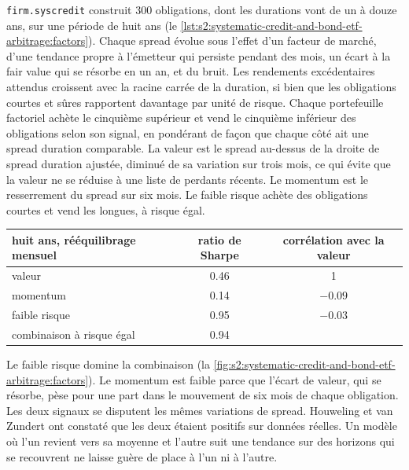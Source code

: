 \texttt{firm.syscredit} construit 300 obligations, dont les durations vont de un à douze ans, sur une période de huit ans
(le \cref{lst:s2:systematic-credit-and-bond-etf-arbitrage:factors}). Chaque spread évolue sous l'effet d'un facteur de marché, d'une tendance propre à l'émetteur qui persiste pendant des mois,
un écart à la fair value qui se résorbe en un an, et du bruit. Les rendements excédentaires attendus croissent avec la racine carrée de la duration, si bien que les obligations courtes et sûres
rapportent davantage par unité de risque. Chaque portefeuille factoriel achète le cinquième supérieur et vend le cinquième inférieur des obligations selon son signal, en pondérant de façon que chaque côté ait une
spread duration comparable. La valeur est le spread au-dessus de la droite de spread duration ajustée, diminué de sa variation sur trois mois, ce qui évite que la valeur ne se réduise à une liste de
perdants récents. Le momentum est le resserrement du spread sur six mois. Le faible risque achète des obligations courtes et vend les longues, à risque égal.

\begin{center}
\small
\begin{tabular}{@{}lcc@{}}
\toprule
huit ans, rééquilibrage mensuel & ratio de Sharpe & corrélation avec la valeur\\
\midrule
valeur & 0.46 & 1\\
momentum & 0.14 & $-0.09$\\
faible risque & 0.95 & $-0.03$\\
combinaison à risque égal & 0.94 &\\
\bottomrule
\end{tabular}
\end{center}

Le faible risque domine la combinaison (la \cref{fig:s2:systematic-credit-and-bond-etf-arbitrage:factors}). Le momentum est faible parce que l'écart de valeur, qui
se résorbe, pèse pour une part dans le mouvement de six mois de chaque obligation. Les deux signaux se disputent les mêmes variations de spread. Houweling et van Zundert ont constaté que les deux
étaient positifs sur données réelles. Un modèle où l'un revient vers sa moyenne et l'autre suit une tendance sur des horizons qui se recouvrent ne laisse guère de place à l'un ni à l'autre.

